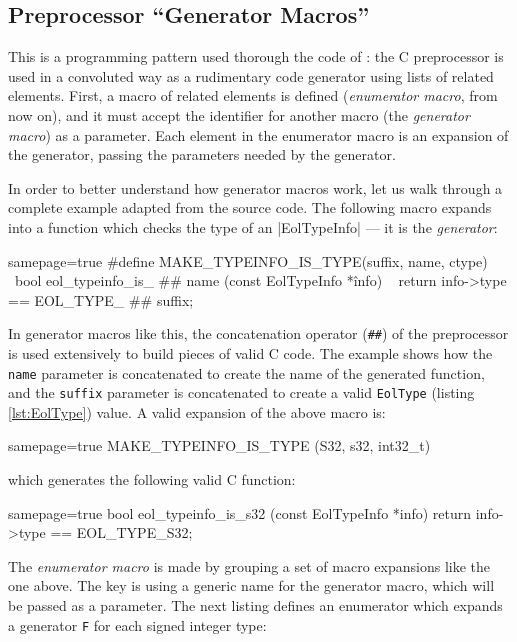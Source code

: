 \subsection{Preprocessor “Generator Macros”}
  \label{sec:cpp-abuse-genmacros}

This is a programming pattern used thorough the code of \Eol*: the
C preprocessor is used in a convoluted way as a rudimentary code generator
using lists of related elements. First, a macro of related elements is defined
(\emph{enumerator macro}, from now on), and it must accept the identifier for
another macro (the \emph{generator macro}) as a parameter. Each element in the
enumerator macro is an expansion of the generator, passing the parameters
needed by the generator.

In order to better understand how generator macros work, let us walk through
a complete example adapted from the \Eol* source code. The following macro
expands into a function which checks the type of an \Mc|EolTypeInfo| — it is
the \emph{generator}:

\begin{ccode*}{samepage=true}
#define MAKE_TYPEINFO_IS_TYPE(suffix, name, ctype)            \
    bool eol_typeinfo_is_ ## name (const EolTypeInfo *înfo) \
    { return info->type == EOL_TYPE_ ## suffix; }
\end{ccode*}

\noindent In generator macros like this, the concatenation operator
(\verb|##|) of the preprocessor is used extensively to build pieces of valid
C code. The example shows how the \verb|name| parameter is concatenated to
create the name of the generated function, and the \verb|suffix| parameter is
concatenated to create a valid \verb|EolType| (listing \vref{lst:EolType})
value. A valid expansion of the above macro is:

\begin{ccode*}{samepage=true}
MAKE_TYPEINFO_IS_TYPE (S32, s32, int32_t)
\end{ccode*}

\noindent
which generates the following valid C function:

\begin{ccode*}{samepage=true}
  bool eol_typeinfo_is_s32 (const EolTypeInfo *info)
  { return info->type == EOL_TYPE_S32; }
\end{ccode*}

\noindent The \emph{enumerator macro} is made by grouping a set of macro
expansions like the one above. The key is using a generic name for the
generator macro, which will be passed as a parameter. The next listing defines
an enumerator which expands a generator \verb|F| for each signed integer type:

